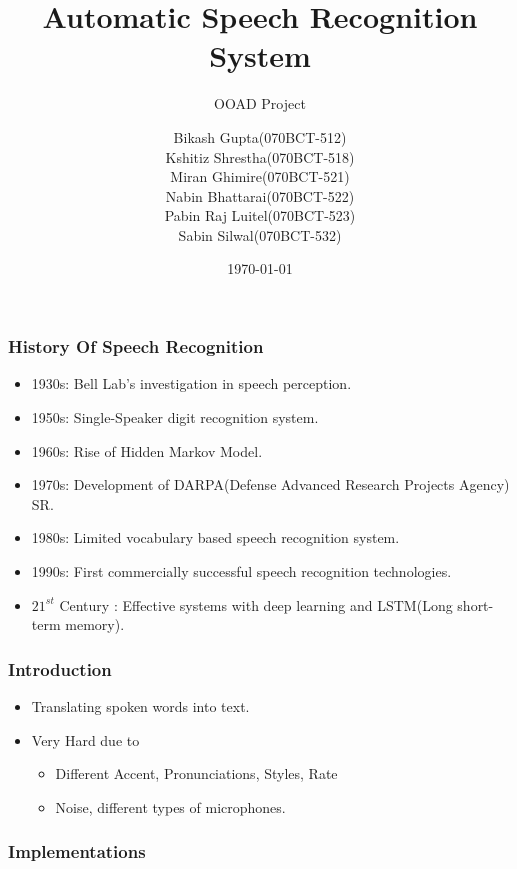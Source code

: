 \documentclass{beamer}
\title{Automatic Speech Recognition System}
\subtitle{OOAD Project}
\author{
  Bikash Gupta(070BCT-512)\\
  Kshitiz Shrestha(070BCT-518)\\
  Miran Ghimire(070BCT-521)\\
  Nabin Bhattarai(070BCT-522)\\
  Pabin Raj Luitel(070BCT-523)\\
  Sabin Silwal(070BCT-532)
}
\institute{IOE, Central Campus Pulchowk}
\date{\today}
\begin{document}
\begin{frame}
\titlepage
\end{frame}

\begin{frame}
  \centering
  \frametitle{History Of Speech Recognition}
  \begin{itemize}
  \item 1930s: Bell Lab's investigation in speech perception.
  \item 1950s: Single-Speaker digit recognition system.
  \item 1960s: Rise of Hidden Markov Model.
  \item 1970s: Development of DARPA(Defense Advanced Research Projects Agency) SR.
  \item 1980s: Limited vocabulary based speech recognition system.
  \item 1990s: First commercially successful speech recognition technologies.
  \item $21^{st}$ Century : Effective systems with deep learning and LSTM(Long short-term memory).
  \end{itemize}
\end{frame}

\begin{frame}
  \centering
  \frametitle{Introduction}
  \begin{itemize}
  \item Translating spoken words into text.
  \item Very Hard due to
    \begin{itemize}
    \item Different Accent, Pronunciations, Styles, Rate
    \item Noise, different types of microphones.
    \end{itemize}
    
  \end{itemize}
\end{frame}

\begin{frame}
  \centering
  \frametitle{Implementations}
\end{frame}
\end{document}
